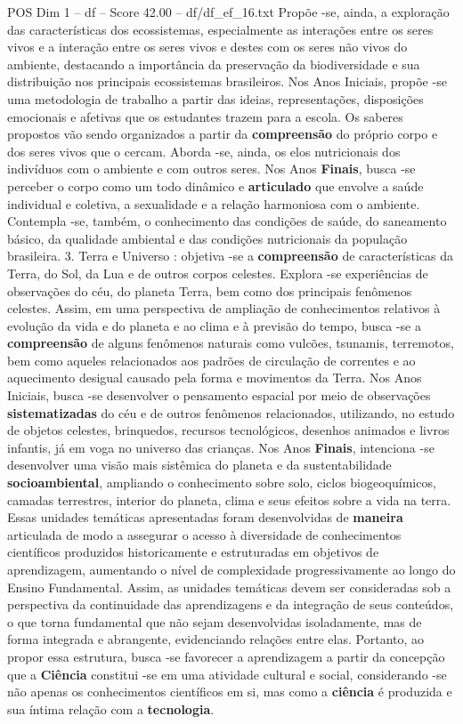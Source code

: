 \begin{textsample}{POS Dim 1 – df – Score 42.00 – df/df\_ef\_16.txt}
Propõe -se, ainda, a exploração das características dos ecossistemas, especialmente as interações entre os seres vivos e a interação entre os seres vivos e destes com os seres não vivos do ambiente, destacando a importância da preservação da biodiversidade e sua distribuição nos principais ecossistemas brasileiros.
Nos Anos Iniciais, propõe -se uma metodologia de trabalho a partir das ideias, representações, disposições emocionais e afetivas que os estudantes trazem para a escola.
Os saberes propostos vão sendo organizados a partir da \textbf{compreensão} do próprio corpo e dos seres vivos que o cercam.
Aborda -se, ainda, os elos nutricionais dos indivíduos com o ambiente e com outros seres.
Nos Anos \textbf{Finais}, busca -se perceber o corpo como um todo dinâmico e \textbf{articulado} que envolve a saúde individual e coletiva, a sexualidade e a relação harmoniosa com o ambiente.
Contempla -se, também, o conhecimento das condições de saúde, do saneamento básico, da qualidade ambiental e das condições nutricionais da população brasileira. 3.
Terra e Universo : objetiva -se a \textbf{compreensão} de características da Terra, do Sol, da Lua e de outros corpos celestes.
Explora -se experiências de observações do céu, do planeta Terra, bem como dos principais fenômenos celestes.
Assim, em uma perspectiva de ampliação de conhecimentos relativos à evolução da vida e do planeta e ao clima e à previsão do tempo, busca -se a \textbf{compreensão} de alguns fenômenos naturais como vulcões, tsunamis, terremotos, bem como aqueles relacionados aos padrões de circulação de correntes e ao aquecimento desigual causado pela forma e movimentos da Terra.
Nos Anos Iniciais, busca -se desenvolver o pensamento espacial por meio de observações \textbf{sistematizadas} do céu e de outros fenômenos relacionados, utilizando, no estudo de objetos celestes, brinquedos, recursos tecnológicos, desenhos animados e livros infantis, já em voga no universo das crianças.
Nos Anos \textbf{Finais}, intenciona -se desenvolver uma visão mais sistêmica do planeta e da sustentabilidade \textbf{socioambiental}, ampliando o conhecimento sobre solo, ciclos biogeoquímicos, camadas terrestres, interior do planeta, clima e seus efeitos sobre a vida na terra.
Essas unidades temáticas apresentadas foram desenvolvidas de \textbf{maneira} articulada de modo a assegurar o acesso à diversidade de conhecimentos científicos produzidos historicamente e estruturadas em objetivos de aprendizagem, aumentando o nível de complexidade progressivamente ao longo do Ensino Fundamental.
Assim, as unidades temáticas devem ser consideradas sob a perspectiva da continuidade das aprendizagens e da integração de seus conteúdos, o que torna fundamental que não sejam desenvolvidas isoladamente, mas de forma integrada e abrangente, evidenciando relações entre elas.
Portanto, ao propor essa estrutura, busca -se favorecer a aprendizagem a partir da concepção que a \textbf{Ciência} constitui -se em uma atividade cultural e social, considerando -se não apenas os conhecimentos científicos em si, mas como a \textbf{ciência} é produzida e sua íntima relação com a \textbf{tecnologia}.


\end{textsample}
